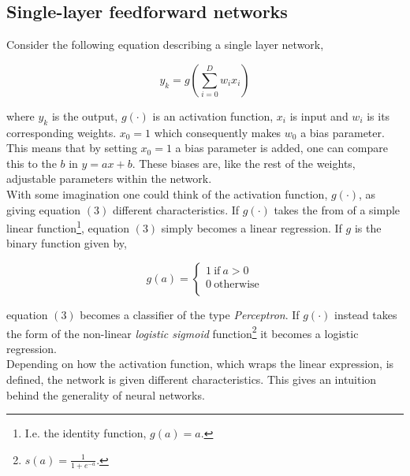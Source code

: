 \documentclass[12pt, letterpaper]{amsart}%
\begin{document}
\subsection{Single-layer feedforward networks}
Consider the following equation describing a single layer network,

\begin{equation}
y_k = g \left( \sum_{i=0}^D w_i x_i \right)
\end{equation}

where $y_k$ is the output, $g(\cdot)$ is an activation function, $x_i$ is input and $w_i$ is its corresponding weights. $x_0 = 1$ which consequently makes $w_0$ a bias parameter. This means that by setting $x_0=1$ a bias parameter is added, one can compare this to the $b$ in $y = ax + b$. These biases are, like the rest of the weights, adjustable parameters within the network.
\\

With some imagination one could think of the activation function, $g(\cdot)$, as giving equation $(3)$ different characteristics. If $g(\cdot)$ takes the from of a simple linear function\footnote{I.e. the identity function, $g(a)=a$.}, equation $(3)$ simply becomes a linear regression. If $g$ is the binary function given by,

\begin{equation}
g(a) = 
     \begin{cases}
       1 \ \text{if} \ a > 0 \\
       0 \ \text{otherwise} \\ 
     \end{cases}
\end{equation}

equation $(3)$ becomes a classifier of the type \textit{Perceptron}. If $g(\cdot)$ instead takes the form of the non-linear \textit{logistic sigmoid} function\footnote{$s(a) = \frac{1}{1+e^{-a}}$.} it becomes a logistic regression.
\\

Depending on how the activation function, which wraps the linear expression, is defined, the network is given different characteristics. This gives an intuition behind the generality of neural networks.
\end{document}
